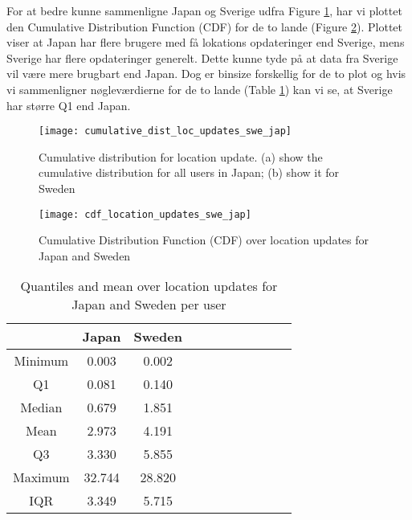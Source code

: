 For at bedre kunne sammenligne Japan og Sverige udfra Figure \ref{fig:country_cd}, har vi plottet den Cumulative Distribution Function (CDF) for de to lande (Figure \ref{fig:country_cdf}). Plottet viser at Japan har flere brugere med få lokations opdateringer end Sverige, mens Sverige har flere opdateringer generelt. Dette kunne tyde på at data fra  Sverige vil være mere brugbart end Japan. Dog er binsize forskellig for de to plot og hvis vi sammenligner nøgleværdierne for de to lande (Table \ref{tab:stat_loc_updates}) kan vi se, at Sverige har større Q1 end Japan.




\begin{figure}[H]
    \centering
    \texttt{[image: cumulative\_dist\_loc\_updates\_swe\_jap]}
    \caption[Cumulative distribution for location update]{Cumulative distribution for location update. (a) show the cumulative distribution for all users in Japan; (b) show it for Sweden}
    \label{fig:country_cd}
\end{figure}



\begin{figure}[H]
    \centering
    \texttt{[image: cdf\_location\_updates\_swe\_jap]}
    \caption{Cumulative Distribution Function (CDF) over location updates for Japan and Sweden}
    \label{fig:country_cdf}
\end{figure}

\begin{table}[htbp]
        \centering
        \small
        \setlength\tabcolsep{2pt}
        \begin{tabular}{|c|c|c|c|c|c|c|c|c|c|c|}
            \hline
                         & Japan      &   Sweden      \\[-3pt]
            \hline
                 Minimum &    0.003       &   0.002          \\
            \hline
                 Q1      &  0.081     &   0.140      \\
            \hline
                 Median  & 0.679     &   1.851      \\
            \hline
                 Mean    &  2.973   &  4.191     \\
            \hline
                 Q3      & 3.330    &   5.855     \\
            \hline
                 Maximum &  32.744 &  28.820     \\
            \hline
                 IQR     &  3.349   &  5.715      \\
            \hline
            
        \end{tabular}
        \caption{Quantiles and mean over location updates for Japan and Sweden per user} %
        \label{tab:stat_loc_updates}
\end{table}


